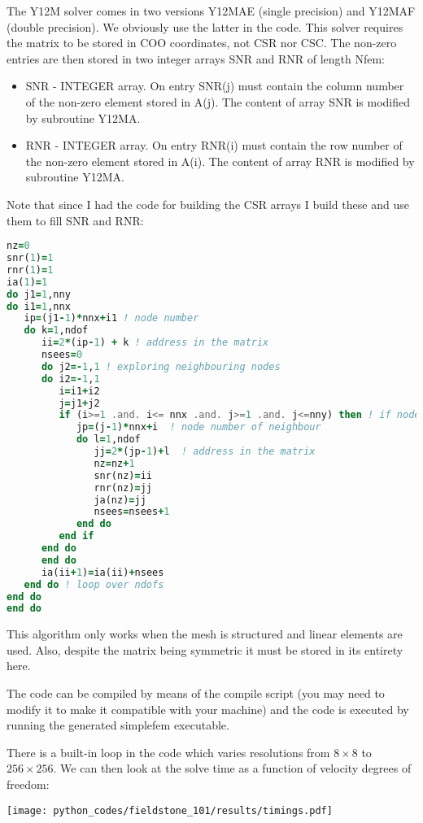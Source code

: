 The Y12M solver comes in two versions Y12MAE (single precision) and Y12MAF (double precision).
We obviously use the latter in the code. 
This solver requires the matrix to be stored in COO coordinates, not CSR nor CSC.
The non-zero entries are then stored in two integer arrays SNR and RNR of length Nfem:
\begin{itemize}
\item SNR - INTEGER array. On entry SNR(j) must contain the
column number of the non-zero element stored in A(j).
The content of array SNR is modified by
subroutine Y12MA. 
\item RNR - INTEGER array. On entry RNR(i) must contain the row
number of the non-zero element stored in A(i).
The content of array RNR is modified by subroutine Y12MA.
\end{itemize}
Note that since I had the code for building the CSR arrays I build these and use them to fill SNR and RNR:
\begin{lstlisting}[language=Fortran]
nz=0
snr(1)=1
rnr(1)=1
ia(1)=1
do j1=1,nny
do i1=1,nnx
   ip=(j1-1)*nnx+i1 ! node number
   do k=1,ndof
      ii=2*(ip-1) + k ! address in the matrix
      nsees=0
      do j2=-1,1 ! exploring neighbouring nodes
      do i2=-1,1
         i=i1+i2
         j=j1+j2
         if (i>=1 .and. i<= nnx .and. j>=1 .and. j<=nny) then ! if node exists
            jp=(j-1)*nnx+i  ! node number of neighbour 
            do l=1,ndof
               jj=2*(jp-1)+l  ! address in the matrix
               nz=nz+1
               snr(nz)=ii
               rnr(nz)=jj
               ja(nz)=jj
               nsees=nsees+1
            end do
         end if
      end do
      end do
      ia(ii+1)=ia(ii)+nsees
   end do ! loop over ndofs
end do
end do
\end{lstlisting}
This algorithm only works when the mesh is structured and linear elements are used. Also, 
despite the matrix being symmetric it must be stored in its entirety here. 

The code can be compiled by means of the {\filenamefont compile} script (you may need to 
modify it to make it compatible with your machine) and the code is executed by running
the generated {\filenamefont simplefem} executable.  

There is a built-in loop in the code which varies resolutions from $8\times 8$ to $256\times 256$.
We can then look at the solve time as a function of velocity degrees of freedom: 

\begin{center}
\texttt{[image: python\_codes/fieldstone\_101/results/timings.pdf]}
\end{center}

